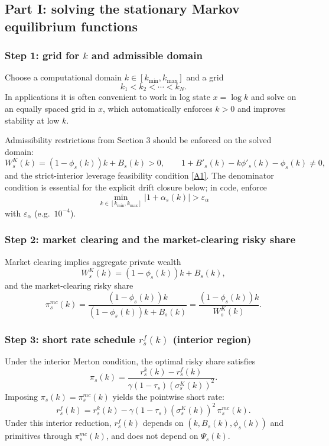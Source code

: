 \documentclass{article}
\begin{document}
\subsection{Part I: solving the stationary Markov equilibrium functions}

\subsubsection{Step 1: grid for $k$ and admissible domain}
Choose a computational domain $k\in[k_{\min},k_{\max}]$ and a grid
\[
k_1<k_2<\cdots<k_N.
\]
In applications it is often convenient to work in log state $x=\log k$ and solve on an equally spaced
grid in $x$, which automatically enforces $k>0$ and improves stability at low $k$.

Admissibility restrictions from Section 3 should be enforced on the solved domain:
\[
W^K_s(k) = (1-\phi_s(k))k + B_s(k) > 0,
\qquad
1 + B'_s(k) - k\phi'_s(k) - \phi_s(k) \neq 0,
\]
and the strict-interior leverage feasibility condition \eqref{A1}. The denominator condition is essential
for the explicit drift closure below; in code, enforce
\[
\min_{k\in[k_{\min},k_{\max}]} |1+\alpha_s(k)| > \varepsilon_\alpha
\]
with $\varepsilon_\alpha$ (e.g.\ $10^{-4}$).

\subsubsection{Step 2: market clearing and the market-clearing risky share}
Market clearing implies aggregate private wealth
\[
W^K_s(k) = (1-\phi_s(k))k + B_s(k),
\]
and the market-clearing risky share
\begin{equation}
\pi^{mc}_s(k)=\frac{(1-\phi_s(k))k}{(1-\phi_s(k))k+B_s(k)}
=\frac{(1-\phi_s(k))k}{W^K_s(k)}.
\tag{50}
\end{equation}

\subsubsection{Step 3: short rate schedule $r^f_s(k)$ (interior region)}
Under the interior Merton condition, the optimal risky share satisfies
\[
\pi_s(k) = \frac{r^k_s(k)-r^f_s(k)}{\gamma(1-\tau_s)(\sigma^K_s(k))^2}.
\]
Imposing $\pi_s(k)=\pi^{mc}_s(k)$ yields the pointwise short rate:
\begin{equation}
r^f_s(k)
=
r^k_s(k) - \gamma(1-\tau_s)(\sigma^K_s(k))^2\,\pi^{mc}_s(k).
\tag{51}
\end{equation}
Under this interior reduction, $r^f_s(k)$ depends on $(k,B_s(k),\phi_s(k))$ and primitives through
$\pi^{mc}_s(k)$, and does not depend on $\Psi_s(k)$.
\end{document}
